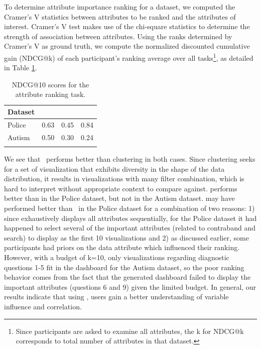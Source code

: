 To determine attribute importance ranking for a dataset, we computed the Cramer's V statistics between attributes to be ranked and the attributes of interest. Cramer's V test makes use of the chi-square statistics to determine the strength of association between attributes. Using the ranks determined by Cramer's V as ground truth, we compute the normalized discounted cumulative gain (NDCG@k) of each participant's ranking average over all tasks\footnote{Since participants are asked to examine all attributes, the k for NDCG@k corresponds to total number of attributes in that dataset.}, as detailed in Table \ref{table:ndcgRankingResult}.
\begin{table}[ht!]
	\centering
	\begin{tabular}{lrrr}
	\hline
	 Dataset   &   \system &   \cluster &   \BFS \\
	\hline
	 Police    &      0.63 &      0.45 &  0.84 \\
	 Autism    &      0.50 &      0.30 &  0.24 \\
	\hline
	\label{table:ndcg_ranking_result}
	\end{tabular}
	\caption{NDCG@10 scores for the attribute ranking task.}
	\vspace{-10pt}
    \label{table:ndcgRankingResult}
\end{table}
We see that \system\ performs better than clustering in both cases. Since clustering seeks for a set of visualization that exhibits diversity in the shape of the data distribution, it results in visualizations with many filter combination, which is hard to interpret without appropriate context to compare against. \BFS performs better than \system in the Police dataset, but not in the Autism dataset. \BFS may have performed better than \system\ in the Police dataset for a combination of two reasons: 1) since \BFS exhaustively displays all attributes sequentially, for the Police dataset it had happened to select several of the important attributes (related to contraband and search) to display as the first 10 visualizations and 2) as discussed earlier, some participants had priors on the data attribute which influenced their ranking. However, with a budget of k=10, only visualizations regarding diagnostic questions 1-5 fit in the dashboard for the Autism dataset, so the poor ranking behavior comes from the fact that the \BFS generated dashboard failed to display the important attributes (questions 6 and 9) given the limited budget. In general, our results indicate that using \system, users gain a better understanding of variable influence and correlation.

